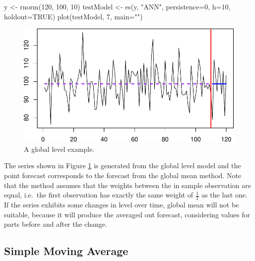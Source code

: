 \documentclass[
]{book}
\newenvironment{Shaded}{\begin{snugshade}}{\end{snugshade}}
\newcommand{\AttributeTok}[1]{\textcolor[rgb]{0.77,0.63,0.00}{#1}}
\newcommand{\ConstantTok}[1]{\textcolor[rgb]{0.00,0.00,0.00}{#1}}
\newcommand{\DecValTok}[1]{\textcolor[rgb]{0.00,0.00,0.81}{#1}}
\newcommand{\FunctionTok}[1]{\textcolor[rgb]{0.00,0.00,0.00}{#1}}
\newcommand{\NormalTok}[1]{#1}
\newcommand{\OtherTok}[1]{\textcolor[rgb]{0.56,0.35,0.01}{#1}}
\newcommand{\StringTok}[1]{\textcolor[rgb]{0.31,0.60,0.02}{#1}}
\theoremstyle{definition}
\theoremstyle{definition}
\theoremstyle{definition}
\theoremstyle{definition}
\theoremstyle{remark}
\begin{document}
\begin{Shaded}
\begin{Highlighting}[]
\NormalTok{y }\OtherTok{\textless{}{-}} \FunctionTok{rnorm}\NormalTok{(}\DecValTok{120}\NormalTok{, }\DecValTok{100}\NormalTok{, }\DecValTok{10}\NormalTok{)}
\NormalTok{testModel }\OtherTok{\textless{}{-}} \FunctionTok{es}\NormalTok{(y, }\StringTok{"ANN"}\NormalTok{, }\AttributeTok{persistence=}\DecValTok{0}\NormalTok{,}
                 \AttributeTok{h=}\DecValTok{10}\NormalTok{, }\AttributeTok{holdout=}\ConstantTok{TRUE}\NormalTok{)}
\FunctionTok{plot}\NormalTok{(testModel, }\DecValTok{7}\NormalTok{, }\AttributeTok{main=}\StringTok{""}\NormalTok{)}
\end{Highlighting}
\end{Shaded}

\begin{figure}
\centering
\includegraphics{adam_files/figure-latex/globalMeanExample-1.pdf}
\caption{\label{fig:globalMeanExample}A global level example.}
\end{figure}

The series shown in Figure \ref{fig:globalMeanExample} is generated from the global level model and the point forecast corresponds to the forecast from the global mean method. Note that the method assumes that the weights between the in sample observation are equal, i.e.~the first observation has exactly the same weight of \(\frac{1}{T}\) as the last one. If the series exhibits some changes in level over time, global mean will not be suitable, because it will produce the averaged out forecast, considering values for parts before and after the change.

\hypertarget{SMA}{%
\subsection{Simple Moving Average}\label{SMA}}
\end{document}
